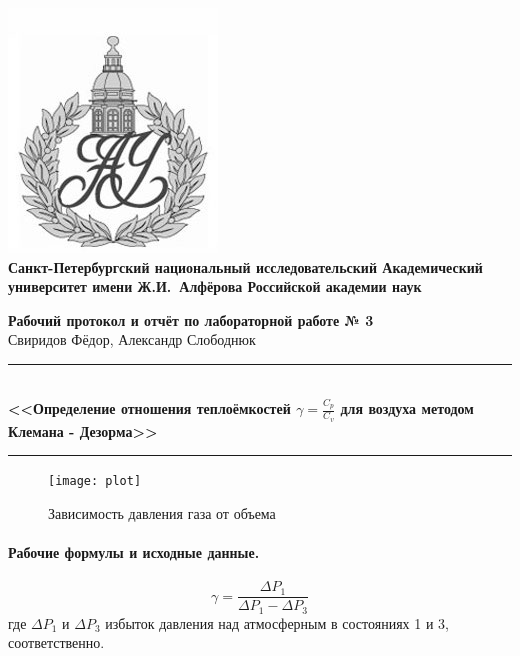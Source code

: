 \documentclass{article}
\begin{document}
\begin{center}
	\includegraphics[scale=0.25]{AU}\\
	{\Large\bfseries Санкт-Петербургский национальный исследовательский Академический университет имени Ж.И.~Алфёрова Российской академии наук}
\end{center}

\begin{center}
	{\large\textbf{Рабочий протокол и отчёт по лабораторной работе № 3}}\\
	Свиридов Фёдор, Александр Слободнюк
\end{center}

\begin{center}
	\rule{12cm}{0.4mm}\\
	\large\bfseries{<<Определение отношения теплоёмкостей $\gamma=\frac{C_p}{C_v}$ для воздуха методом Клемана - Дезорма>>}\\
	\rule{12cm}{0.4mm}
\end{center}

\begin{figure}[htb]
		\centering\texttt{[image: plot]}
		\caption{Зависимость давления газа от объема}
\end{figure}
\paragraph{Рабочие формулы и исходные данные.}\hypertarget{formuls}{}
\begin{equation}
	\gamma=\frac{\Delta P_1}{\Delta P_1 - \Delta P_3}
\end{equation}
где $\Delta P_1$ и $\Delta P_3$ избыток давления над атмосферным в состояниях 1 и 3, соответственно.
\end{document}
